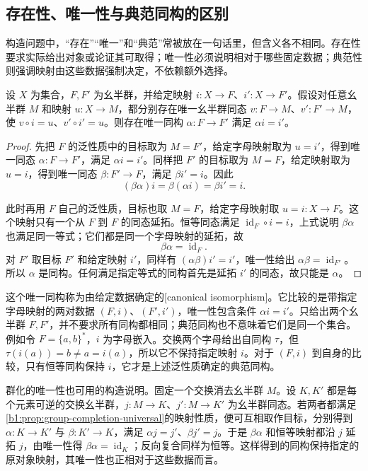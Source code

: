 \subsection{存在性、唯一性与典范同构的区别}
\label{b1:subsec:0104:03}

构造问题中，“存在”“唯一”和“典范”常被放在一句话里，但含义各不相同。存在性要求实际给出对象或论证其可取得；唯一性必须说明相对于哪些固定数据；典范性则强调映射由这些数据强制决定，不依赖额外选择。

\begin{theorem}[自由幺半群由泛性质唯一确定]\label{b1:thm:universal-uniqueness}
	设 \(X\) 为集合，\(F,F'\) 为幺半群，并给定映射 \(i:X\rightarrow F\)、\(i':X\rightarrow F'\)。假设对任意幺半群 \(M\) 和映射 \(u:X\rightarrow M\)，都分别存在唯一幺半群同态 \(v:F\rightarrow M\)、\(v':F'\rightarrow M\)，使 \(v\circ i=u\)、\(v'\circ i'=u\)。则存在唯一同构 \(\alpha:F\rightarrow F'\) 满足 \(\alpha i=i'\)。
\end{theorem}

\begin{proof}
	先把 \(F\) 的泛性质中的目标取为 \(M=F'\)，给定字母映射取为 \(u=i'\)，得到唯一同态 \(\alpha:F\rightarrow F'\)，满足 \(\alpha i=i'\)。同样把 \(F'\) 的目标取为 \(M=F\)，给定映射取为 \(u=i\)，得到唯一同态 \(\beta:F'\rightarrow F\)，满足 \(\beta i'=i\)。因此
	\[
		(\beta\alpha)i=\beta(\alpha i)=\beta i'=i.
	\]

	此时再用 \(F\) 自己的泛性质，目标也取 \(M=F\)，给定字母映射取 \(u=i:X\rightarrow F\)。这个映射只有一个从 \(F\) 到 \(F\) 的同态延拓。恒等同态满足 \(\operatorname{id}_F\circ i=i\)，上式说明 \(\beta\alpha\) 也满足同一等式；它们都是同一个字母映射的延拓，故
	\[
		\beta\alpha=\operatorname{id}_F.
	\]
	对 \(F'\) 取目标 \(F'\) 和给定映射 \(i'\)，同样有 \((\alpha\beta)i'=i'\)，唯一性给出 \(\alpha\beta=\operatorname{id}_{F'}\)。所以 \(\alpha\) 是同构。任何满足指定等式的同构首先是延拓 \(i'\) 的同态，故只能是 \(\alpha\)。
\end{proof}

这个唯一同构称为由给定数据确定的[canonical isomorphism]。它比较的是带指定字母映射的两对数据 \((F,i)\)、\((F',i')\)，唯一性包含条件 \(\alpha i=i'\)。只给出两个幺半群 \(F,F'\)，并不要求所有同构都相同；典范同构也不意味着它们是同一个集合。例如令 \(F=\{a,b\}^*\)，\(i\) 为字母嵌入。交换两个字母给出自同构 \(\tau\)，但 \(\tau(i(a))=b\ne a=i(a)\)，所以它不保持指定映射 \(i\)。对于 \((F,i)\) 到自身的比较，只有恒等同构保持 \(i\)，它才是上述泛性质确定的典范同构。

\ProseParagraphBreak
群化的唯一性也可用的构造说明。固定一个交换消去幺半群 \(M\)。设 \(K,K'\) 都是每个元素可逆的交换幺半群，\(j:M\rightarrow K\)、\(j':M\rightarrow K'\) 为幺半群同态。若两者都满足\cref{b1:prop:group-completion-universal}的映射性质，便可互相取作目标，分别得到 \(\alpha:K\rightarrow K'\) 与 \(\beta:K'\rightarrow K\)，满足 \(\alpha j=j'\)、\(\beta j'=j\)。于是 \(\beta\alpha\) 和恒等映射都沿 \(j\) 延拓 \(j\)，由唯一性得 \(\beta\alpha=\operatorname{id}_K\)；反向复合同样为恒等。这样得到的同构保持指定的原对象映射，其唯一性也正相对于这些数据而言。
